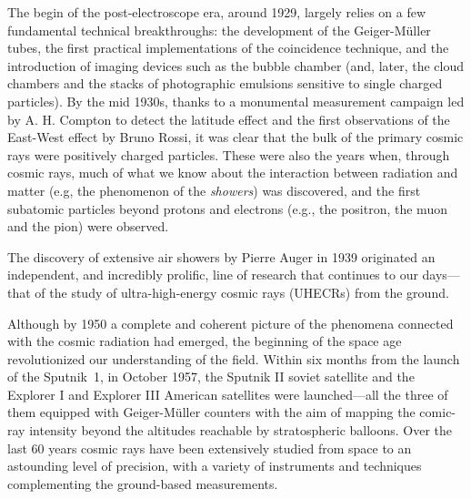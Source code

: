The begin of the post-electroscope era, around 1929, largely relies on a few fundamental
technical breakthroughs: the development of the Geiger-M\"uller tubes, the first
practical implementations of the coincidence technique, and the introduction of imaging
devices such as the bubble chamber (and, later, the cloud chambers and the stacks of
photographic emulsions sensitive to single charged particles).
By the mid 1930s, thanks to a monumental measurement campaign led by A. H. Compton
to detect the latitude effect and the first observations of the East-West effect by
Bruno Rossi, it was clear that the bulk of the primary cosmic rays were positively
charged particles.
These were also the years when, through cosmic rays, much of what we know about the
interaction between radiation and matter (e.g, the phenomenon of the \emph{showers})
was discovered, and the first subatomic particles beyond protons and electrons
(e.g., the positron, the muon and the pion) were observed.

The discovery of extensive air showers by Pierre Auger in 1939 originated an independent,
and incredibly prolific, line of research that continues to our days---that of the study
of ultra-high-energy cosmic rays (UHECRs) from the ground.

Although by 1950 a complete and coherent picture of the phenomena connected with
the cosmic radiation had emerged, the beginning of the space age revolutionized
our understanding of the field. Within six months from the launch of the Sputnik~1,
in October 1957, the Sputnik II soviet satellite and the Explorer I and Explorer III
American satellites were launched---all the three of them equipped with Geiger-M\"uller
counters with the aim of mapping the comic-ray intensity beyond the altitudes reachable
by stratospheric balloons. Over the last 60 years cosmic rays have been extensively
studied from space to an astounding level of precision, with a variety of instruments
and techniques complementing the ground-based measurements.

